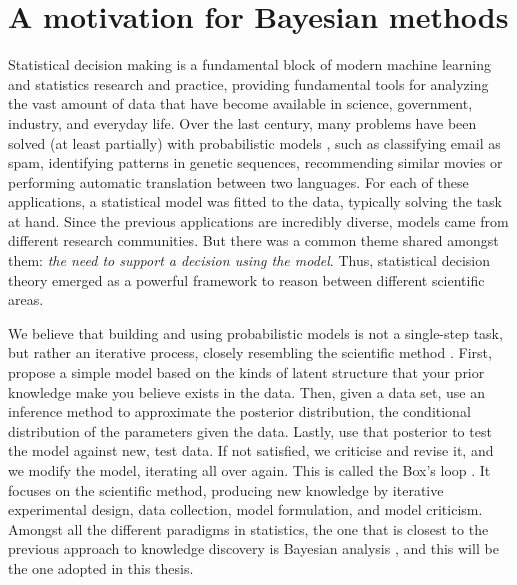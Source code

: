 
\section{A motivation for Bayesian methods}

Statistical decision making \parencite{french} is a fundamental block of modern machine learning and statistics research and practice,
providing fundamental tools for analyzing the vast amount of data that have become available in science, government, industry, and everyday life. Over the last century, many problems have been solved (at least partially) with probabilistic models \parencite{bishop2006pattern}, such as classifying email as spam, identifying patterns in genetic sequences, recommending similar movies or performing automatic translation between two languages. For each of these applications, a statistical model was fitted to the data, typically solving the task at hand. Since the previous applications are incredibly diverse,  models came from  different research communities. But there was a common theme shared amongst them: \emph{the need to support a decision using the model}. Thus, statistical decision theory  emerged as a powerful framework to reason between different scientific areas. 

We believe that building and using probabilistic models is not a single-step task, but rather an iterative process, closely resembling the scientific method \parencite{conant1959understanding}. First, propose a simple model based on the kinds of latent structure that your prior knowledge make you believe exists in the data. Then, given a data set, use an inference
method to approximate the posterior distribution, the conditional distribution of the  parameters
given the data. Lastly,
use that posterior to test the model against new, test data. If not satisfied, we criticise and revise it, and we modify the model, iterating all over again. This is called the Box's loop \parencite{doi:10.1080/00401706.1962.10490015,10.2307/1266125}. It focuses on the scientific method, producing new knowledge  by iterative experimental design, data collection,
model formulation, and model criticism.
Amongst all the different paradigms in statistics, the one that is closest to the previous approach to knowledge discovery is Bayesian analysis \parencite{gelman2013bayesian,insua2012bayesian}, and this will be the one adopted in this thesis.


